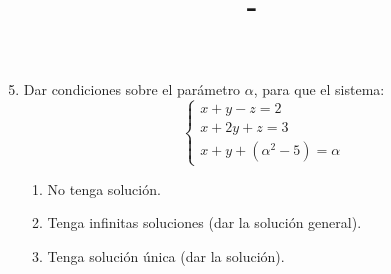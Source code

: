 \documentclass{article}
\author{\MyAuthor{}}
\title{\MyClass{} \-- \MyTitle{}}
\begin{document}
\maketitle

\begin{enumerate}
    \setcounter{enumi}{4}
    \item Dar condiciones sobre el parámetro \(\alpha\), para que el sistema:
        \[
            \left\{
            \begin{aligned}
                x + y - z = 2 \\
                x + 2y + z = 3 \\
                x + y + \left(\alpha^2 - 5\right) = \alpha
            \end{aligned}
            \right.
        \]
        \begin{enumerate}[label=\listAlph]
            \item No tenga solución.
            \item Tenga infinitas soluciones (dar la solución general).
            \item Tenga solución única (dar la solución).
        \end{enumerate}


\end{enumerate}
\end{document}
